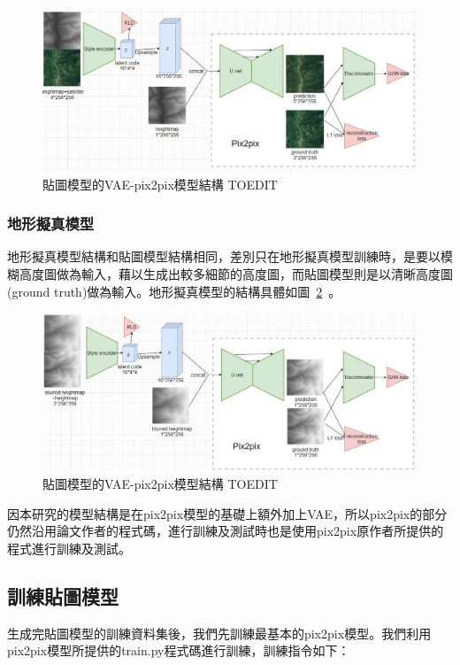 \documentclass[a4paper, 12pt]{article}
\begin{document}
\begin{figure}[htbp]
    \centering
    \includegraphics[width=\linewidth]{fig/11.jpg}
    \caption{貼圖模型的VAE-pix2pix模型結構 TOEDIT}
    \label{fig:11}
\end{figure}

\subsubsection{地形擬真模型}
地形擬真模型結構和貼圖模型結構相同，差別只在地形擬真模型訓練時，是要以模糊高度圖做為輸入，藉以生成出較多細節的高度圖，而貼圖模型則是以清晰高度圖(ground truth)做為輸入。地形擬真模型的結構具體如圖~\ref{fig:12}~。

\begin{figure}[htbp]
    \centering
    \includegraphics[width=\linewidth]{fig/12.jpg}
    \caption{貼圖模型的VAE-pix2pix模型結構 TOEDIT}
    \label{fig:12}
\end{figure}

因本研究的模型結構是在pix2pix模型的基礎上額外加上VAE，所以pix2pix的部分仍然沿用論文作者的程式碼，進行訓練及測試時也是使用pix2pix原作者所提供的程式進行訓練及測試。


\subsection{訓練貼圖模型}
生成完貼圖模型的訓練資料集後，我們先訓練最基本的pix2pix模型。我們利用pix2pix模型所提供的train.py程式碼進行訓練，訓練指令如下：
\end{document}
